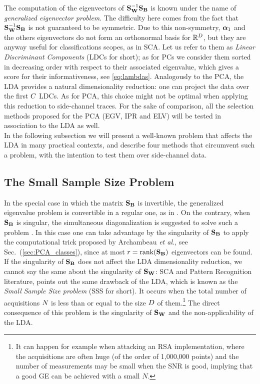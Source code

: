 The computation of the eigenvectors of $\SW^{-1} \SB$ is known under the name of {\em generalized eigenvector problem}. The difficulty here comes from the fact that $\SW^{-1} \SB$ is not guaranteed to be symmetric. Due to this non-symmetry,  $\AAlpha_1$ and the others eigenvectors do not form an orthonormal basis for $\mathbb{R}^\traceLength$, but they are anyway useful for classifications scopes, as in SCA. Let us refer to them as {\em Linear Discriminant Components} (LDCs for short); as for PCs we consider them sorted in decreasing order with respect to their associated eigenvalue, which gives a score for their informativeness, see \eqref{eq:lambdas}. Analogously to the PCA, the LDA provides a natural dimensionality reduction: one can project the data over the first $\newTraceLength$ LDCs. As for PCA, this choice might not be optimal when applying this reduction to side-channel traces. For the sake of comparison, all the selection methods proposed for the PCA (EGV, IPR and ELV) will be tested in association to the LDA as well.\\

In the following subsection we will present a well-known problem that affects the LDA in many practical contexts, and describe four methods that circumvent such a problem, with the intention to test them over side-channel data.



\subsection{The Small Sample Size Problem}\label{sec:SSS}
In the special case in which the matrix $\SB$ is invertible, the generalized eigenvalue problem is convertible in a regular one, as in \cite{Standaert2008}. On the contrary, when $\SB$ is singular, the simultaneous diagonalization is suggested to solve such a problem \cite{Fukunaga}. In this case one can take advantage by the singularity of $\SB$ to apply the computational trick proposed by Archambeau \textit{et al.}, see Sec.~(\ref{sec:PCA_classes}), since at most $r = \mathrm{rank}(\SB)$ eigenvectors can be found.\\

If the singularity of $\SB$ does not affect the LDA dimensionality reduction, we cannot say the same about the singularity of $\SW$:  SCA and Pattern Recognition literature, points out the same drawback of the LDA, which is known as the {\em Small Sample Size problem} (SSS for short). It occurs when the total number of acquisitions $\numTraces[]$ is less than or equal to the size $\traceLength$ of them.\footnote{It can happen for example when attacking an RSA implementation, where the acquisitions are often huge (of the order of 1,000,000 points) and the number of measurements may be small when the SNR is good, implying that a good GE can be achieved with a small $N$.} The direct consequence of this problem is the singularity of $\SW$ and the non-applicability of the LDA. \\

